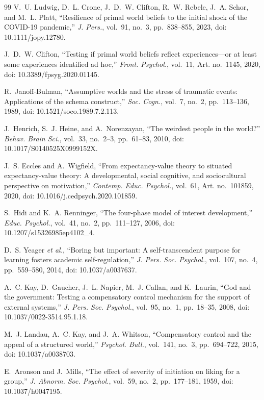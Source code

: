 \documentclass[journal,a4paper]{IEEEtran}
\begin{document}
\begin{thebibliography}{99}
V.~U. Ludwig, D.~L. Crone, J.~D.~W. Clifton, R.~W. Rebele, J.~A. Schor, and M.~L. Platt, ``Resilience of primal world beliefs to the initial shock of the COVID-19 pandemic,'' \emph{J. Pers.}, vol.~91, no.~3, pp.~838--855, 2023, doi: 10.1111/jopy.12780.

J.~D.~W. Clifton, ``Testing if primal world beliefs reflect experiences---or at least some experiences identified ad hoc,'' \emph{Front. Psychol.}, vol.~11, Art. no.~1145, 2020, doi: 10.3389/fpsyg.2020.01145.

R.~Janoff-Bulman, ``Assumptive worlds and the stress of traumatic events: Applications of the schema construct,'' \emph{Soc. Cogn.}, vol.~7, no.~2, pp.~113--136, 1989, doi: 10.1521/soco.1989.7.2.113.

J.~Henrich, S.~J. Heine, and A.~Norenzayan, ``The weirdest people in the world?'' \emph{Behav. Brain Sci.}, vol.~33, no.~2--3, pp.~61--83, 2010, doi: 10.1017/S0140525X0999152X.

J.~S. Eccles and A.~Wigfield, ``From expectancy-value theory to situated expectancy-value theory: A developmental, social cognitive, and sociocultural perspective on motivation,'' \emph{Contemp. Educ. Psychol.}, vol.~61, Art. no.~101859, 2020, doi: 10.1016/j.cedpsych.2020.101859.

S.~Hidi and K.~A. Renninger, ``The four-phase model of interest development,'' \emph{Educ. Psychol.}, vol.~41, no.~2, pp.~111--127, 2006, doi: 10.1207/s15326985ep4102\_4.

D.~S. Yeager \emph{et al.}, ``Boring but important: A self-transcendent purpose for learning fosters academic self-regulation,'' \emph{J. Pers. Soc. Psychol.}, vol.~107, no.~4, pp.~559--580, 2014, doi: 10.1037/a0037637.

A.~C. Kay, D.~Gaucher, J.~L. Napier, M.~J. Callan, and K.~Laurin, ``God and the government: Testing a compensatory control mechanism for the support of external systems,'' \emph{J. Pers. Soc. Psychol.}, vol.~95, no.~1, pp.~18--35, 2008, doi: 10.1037/0022-3514.95.1.18.

M.~J. Landau, A.~C. Kay, and J.~A. Whitson, ``Compensatory control and the appeal of a structured world,'' \emph{Psychol. Bull.}, vol.~141, no.~3, pp.~694--722, 2015, doi: 10.1037/a0038703.

E.~Aronson and J.~Mills, ``The effect of severity of initiation on liking for a group,'' \emph{J. Abnorm. Soc. Psychol.}, vol.~59, no.~2, pp.~177--181, 1959, doi: 10.1037/h0047195.


\end{thebibliography}
\end{document}
